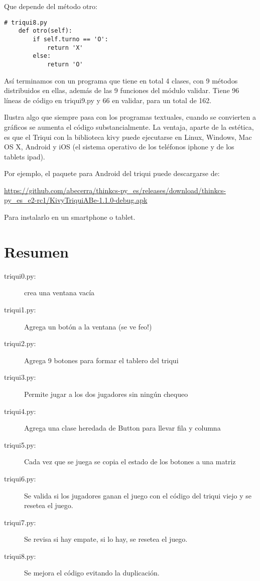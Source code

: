 Que depende del método otro:

\begin{lstlisting}
# triqui8.py
    def otro(self):
        if self.turno == 'O':
            return 'X'
        else:
            return 'O'
\end{lstlisting}

Así terminamos con un programa que tiene en total 4 clases, con 9
métodos distribuidos en ellas, además de las 9 funciones del módulo
validar. Tiene 96 líneas de código en triqui9.py y 66 en validar,
para un total de 162.

Ilustra algo que siempre pasa con los programas textuales, cuando
se convierten a gráficos se aumenta el código substancialmente. La
ventaja, aparte de la estética, es que el Triqui con la biblioteca
kivy puede ejecutarse en Linux, Windows, Mac OS X, Android y iOS (el
sistema operativo de los teléfonos iphone y de los tablets ipad).

Por ejemplo, el paquete para Android del triqui puede descargarse
de:

\url{https://github.com/abecerra/thinkcs-py_es/releases/download/thinkcs-py_es_e2-rc1/KivyTriquiABe-1.1.0-debug.apk}

Para instalarlo en un smartphone o tablet.

\section{Resumen}
\begin{description}
\item [{triqui0.py:}] crea una ventana vacía 
\item [{triqui1.py:}] Agrega un botón a la ventana (se ve feo!) 
\item [{triqui2.py:}] Agrega 9 botones para formar el tablero del triqui 
\item [{triqui3.py:}] Permite jugar a los dos jugadores sin ningún chequeo 
\item [{triqui4.py:}] Agrega una clase heredada de Button para llevar fila
y columna 
\item [{triqui5.py:}] Cada vez que se juega se copia el estado de los botones
a una matriz 
\item [{triqui6.py:}] Se valida si los jugadores ganan el juego con el
código del triqui viejo y se resetea el juego. 
\item [{triqui7.py:}] Se revisa si hay empate, si lo hay, se resetea el
juego. 
\item [{triqui8.py:}] Se mejora el código evitando la duplicación. 
\end{description}

